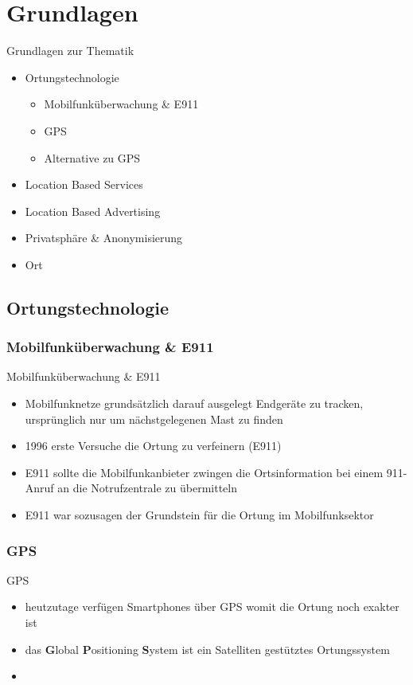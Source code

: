 \section{Grundlagen}
\begin{frame}{Grundlagen zur Thematik}
\begin{itemize}
  \item Ortungstechnologie
  \begin{itemize}
    \item Mobilfunküberwachung \& E911
    \item GPS
    \item Alternative zu GPS
  \end{itemize}
  \item Location Based Services
  \item Location Based Advertising
  \item Privatsphäre \& Anonymisierung
  \item Ort
\end{itemize}
\end{frame}

\subsection{Ortungstechnologie}
\subsubsection{Mobilfunküberwachung \& E911}
\begin{frame}{Mobilfunküberwachung \& E911}
\begin{itemize}
  \item Mobilfunknetze grundsätzlich darauf ausgelegt Endgeräte zu tracken, ursprünglich nur um nächstgelegenen Mast zu finden
  \item 1996 erste Versuche die Ortung zu verfeinern (E911)
  \item E911 sollte die Mobilfunkanbieter zwingen die Ortsinformation bei einem 911-Anruf an die Notrufzentrale zu übermitteln
  \item E911 war sozusagen der Grundstein für die Ortung im Mobilfunksektor
\end{itemize}
\end{frame}

\subsubsection{GPS}
\begin{frame}{GPS}
\begin{itemize}
  \item heutzutage verfügen Smartphones über GPS womit die Ortung noch exakter ist
  \item das \textbf{G}lobal \textbf{P}ositioning \textbf{S}ystem ist ein Satelliten gestütztes Ortungssystem
  \item 
\end{itemize}
\end{frame}

